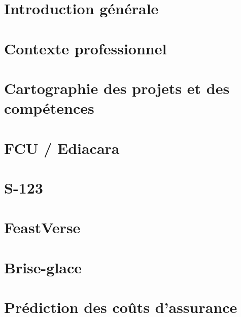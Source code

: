 \documentclass[11pt,a4paper]{report}
\begin{document}

\clearpage
{}
\setcounter{page}{1}
\tableofcontents
\listoffigures
\listoftables
\chapter*{Introduction générale}

\chapter{Contexte professionnel}
\label{chap:contexte-professionnel}

\chapter{Cartographie des projets et des compétences}
\label{chap:cartographie}

\chapter{FCU / Ediacara}
\label{chap:fcu}
\begingroup




\endgroup
\chapter{S-123}
\label{chap:s123}
\begingroup




\endgroup
\chapter{FeastVerse}
\label{chap:feastverse}
\begingroup



\endgroup
\chapter{Brise-glace}
\label{chap:brise-glace}
\begingroup


\endgroup
\chapter{Prédiction des coûts d'assurance}
\label{chap:data-ia}
\begingroup


\endgroup
\end{document}
